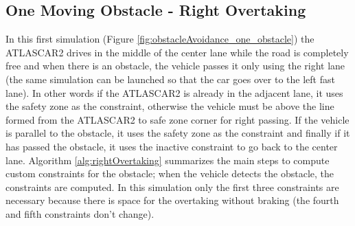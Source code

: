\subsection{One Moving Obstacle - Right Overtaking}
In this first simulation
(Figure \ref{fig:obstacleAvoidance_one_obstacle}) the ATLASCAR2 drives in the middle of the center lane while the road is completely free and when there is an obstacle, the vehicle passes it only using the right lane (the same simulation can be launched so that the car goes over to the left fast lane). In other words if the ATLASCAR2 is already in the adjacent lane, it uses the safety zone as the constraint, otherwise the vehicle must be above the line formed from the ATLASCAR2 to safe zone corner for right passing. If the vehicle is parallel to the obstacle, it  uses the safety zone as the constraint and finally if it has passed the obstacle, it uses the inactive constraint to go back to the center lane.
Algorithm \ref{alg:rightOvertaking} summarizes the main steps to compute custom constraints for the obstacle; when the vehicle detects the obstacle, the constraints are computed. In this simulation only the first three constraints are necessary because there is space for the overtaking without braking (the fourth and fifth constraints don't change).

